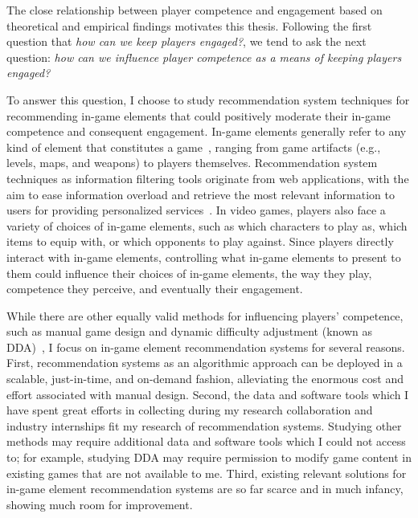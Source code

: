 The close relationship between player competence and engagement based on theoretical and empirical findings motivates this thesis. Following the first question that \textit{how can we keep players engaged?}, we tend to ask the next question: \textit{how can we influence player competence as a means of keeping players engaged?}

To answer this question, I choose to study recommendation system techniques \cite{medler2011using} for recommending in-game elements that could positively moderate their in-game competence and consequent engagement. In-game elements generally refer to any kind of element that constitutes a game~\cite{ralph2015toward,fullerton2008game}, ranging from game artifacts (e.g., levels, maps, and weapons) to players themselves. Recommendation system techniques as information filtering tools originate from web applications, with the aim to ease information overload and retrieve the most relevant information to users for providing personalized services~\cite{isinkaye2015recommendation,bobadilla2013recommender,resnick1997recommender,adomavicius2005toward}. In video games, players also face a variety of choices of in-game elements, such as which characters to play as, which items to equip with, or which opponents to play against. Since players directly interact with in-game elements, controlling what in-game elements to present to them could influence their choices of in-game elements, the way they play, competence they perceive, and eventually their engagement. 


While there are other equally valid methods for influencing players' competence, such as manual game design and dynamic difficulty adjustment (known as DDA)~\cite{hunicke2005case}, I focus on in-game element recommendation systems for several reasons. First, recommendation systems as an algorithmic approach can be deployed in a scalable, just-in-time, and on-demand fashion, alleviating the enormous cost and effort associated with manual design.
Second, the data and software tools which I have spent great efforts in collecting during my research collaboration and industry internships fit my research of recommendation systems. Studying other methods may require additional data and software tools which I could not access to; for example, studying DDA may require permission to modify game content in existing games that are not available to me. Third, existing relevant solutions for in-game element recommendation systems are so far scarce and in much infancy, showing much room for improvement. 

